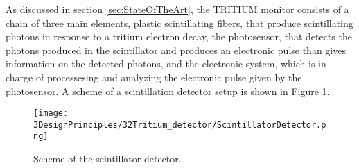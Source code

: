 As discussed in section \ref{sec:StateOfTheArt}, the TRITIUM monitor consists of a chain of three main elements, plastic scintillating fibers, that produce scintillating photons in response to a tritium electron decay, the photosensor, that detects the photons produced in the scintillator and produces an electronic pulse than gives information on the detected photons, and the electronic system, which is in charge of processesing and analyzing the electronic pulse given by the photosensor. A scheme of a scintillation detector setup is shown in Figure \ref{fig:ScintillatorDetector}.

\begin{figure}[hbtp]
\texttt{[image: 3DesignPrinciples/32Tritium\_detector/ScintillatorDetector.png]}
\centering
\caption{Scheme of the scintillator detector.\label{fig:ScintillatorDetector}}
\end{figure}
